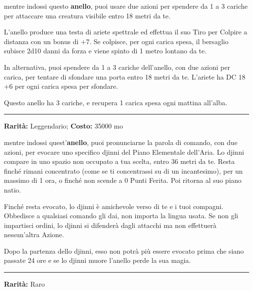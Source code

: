 \begin{multicols}{2}
mentre indossi questo \textbf{anello}, puoi usare due azioni per spendere da 1 a 3 cariche per attaccare una creatura visibile entro 18 metri da te.

L'anello produce una testa di ariete spettrale ed effettua il suo Tiro per Colpire a distanza con un bonus di +7. Se colpisce, per ogni carica spesa, il bersaglio subisce 2d10 danni da forza e viene spinto di 1 metro lontano da te.

In alternativa, puoi spendere da 1 a 3 cariche dell'anello, con due azioni per carica, per tentare di sfondare una porta entro 18 metri da te. L'ariete ha DC 18 +6 per ogni carica spesa per sfondare.

Questo anello ha 3 cariche, e recupera 1 carica spesa ogni mattina all'alba.

\smallskip\noindent\rule{\linewidth}{2pt}  \hypertarget{Anellodell'EvocazionedelloDjinni}{}\smallskip{}\noindent\label{Anellodell'EvocazionedelloDjinni}

\textbf{Rarità:} Leggendario; \textbf{Costo:} 35000 mo

mentre indossi quest'\textbf{anello}, puoi pronunciarne la parola di comando, con due azioni, per evocare uno specifico djinni del Piano Elementale dell'Aria. Lo djinni compare in uno spazio non occupato a tua scelta, entro 36 metri da te. Resta finché rimani concentrato (come se ti concentrassi su di un incantesimo), per un massimo di 1 ora, o finché non scende a 0 Punti Ferita. Poi ritorna al suo piano natio.

Finché resta evocato, lo djinni è amichevole verso di te e i tuoi compagni. Obbedisce a qualsiasi comando gli dai, non importa la lingua usata. Se non gli impartisci ordini, lo djinni si difenderà dagli attacchi ma non effettuerà nessun'altra Azione.

Dopo la partenza dello djinni, esso non potrà più essere evocato prima che siano passate 24 ore e se lo djinni muore l'anello perde la sua magia.

\smallskip\noindent\rule{\linewidth}{2pt}  \hypertarget{Anellodell'Inganno}{}\smallskip{}\noindent\label{Anellodell'Inganno}

\textbf{Rarità:} Raro


\end{multicols}
